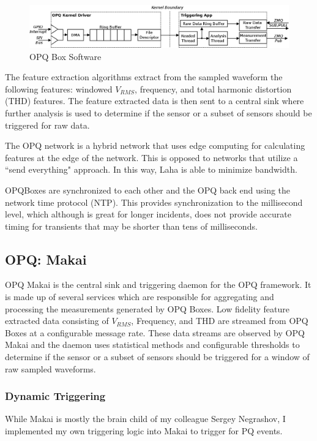 \begin{figure}
	\centering
	\includegraphics[width=.75\linewidth]{figures/opqbox_software.png}
	\caption{OPQ Box Software}\label{fig:opq-box-software}
\end{figure}

The feature extraction algorithms extract from the sampled waveform the following features: windowed $V_{RMS}$, frequency, and total harmonic distortion (THD) features. The feature extracted data is then sent to a central sink where further analysis is used to determine if the sensor or a subset of sensors should be triggered for raw data.

The OPQ network is a hybrid network that uses edge computing for calculating features at the edge of the network. This is opposed to networks that utilize a ``send everything" approach. In this way, Laha is able to minimize bandwidth. 

OPQBoxes are synchronized to each other and the OPQ back end using the network time protocol (NTP). This provides synchronization to the millisecond level, which although is great for longer incidents, does not provide accurate timing for transients that may be shorter than tens of milliseconds.

\subsection{OPQ: Makai}
OPQ Makai is the central sink and triggering daemon for the OPQ framework. It is made up of several services which are responsible for aggregating and processing the measurements generated by OPQ Boxes. Low fidelity feature extracted data consisting of $V_{RMS}$, Frequency, and THD are streamed from OPQ Boxes at a configurable message rate. These data streams are observed by OPQ Makai and the daemon uses statistical methods and configurable thresholds to determine if the sensor or a subset of sensors should be triggered for a window of raw sampled waveforms. 

\subsubsection{Dynamic Triggering}

While Makai is mostly the brain child of my colleague Sergey Negrashov, I implemented my own triggering logic into Makai to trigger for PQ events.


